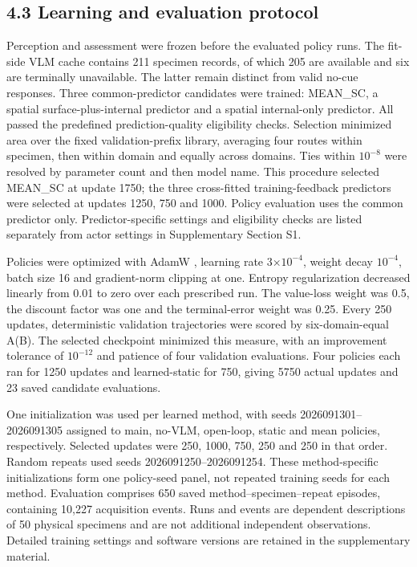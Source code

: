 \subsection{4.3 Learning and evaluation protocol}\label{learning-and-evaluation-protocol}

Perception and assessment were frozen before the evaluated policy runs. The fit-side VLM cache contains 211 specimen records, of which 205 are available and six are terminally unavailable. The latter remain distinct from valid no-cue responses. Three common-predictor candidates were trained: MEAN\_SC, a spatial surface-plus-internal predictor and a spatial internal-only predictor. All passed the predefined prediction-quality eligibility checks. Selection minimized area over the fixed validation-prefix library, averaging four routes within specimen, then within domain and equally across domains. Ties within \(10^{-8}\) were resolved by parameter count and then model name. This procedure selected MEAN\_SC at update 1750; the three cross-fitted training-feedback predictors were selected at updates 1250, 750 and 1000. Policy evaluation uses the common predictor only. Predictor-specific settings and eligibility checks are listed separately from actor settings in Supplementary Section S1.

Policies were optimized with AdamW \citep{loshchilov2019}, learning rate 3×\(10^{-4}\), weight decay \(10^{-4}\), batch size 16 and gradient-norm clipping at one. Entropy regularization decreased linearly from 0.01 to zero over each prescribed run. The value-loss weight was 0.5, the discount factor was one and the terminal-error weight was 0.25. Every 250 updates, deterministic validation trajectories were scored by six-domain-equal A(B). The selected checkpoint minimized this measure, with an improvement tolerance of \(10^{-12}\) and patience of four validation evaluations. Four policies each ran for 1250 updates and learned-static for 750, giving 5750 actual updates and 23 saved candidate evaluations.

One initialization was used per learned method, with seeds 2026091301--2026091305 assigned to main, no-VLM, open-loop, static and mean policies, respectively. Selected updates were 250, 1000, 750, 250 and 250 in that order. Random repeats used seeds 2026091250--2026091254. These method-specific initializations form one policy-seed panel, not repeated training seeds for each method. Evaluation comprises 650 saved method--specimen--repeat episodes, containing 10,227 acquisition events. Runs and events are dependent descriptions of 50 physical specimens and are not additional independent observations. Detailed training settings and software versions are retained in the supplementary material.

